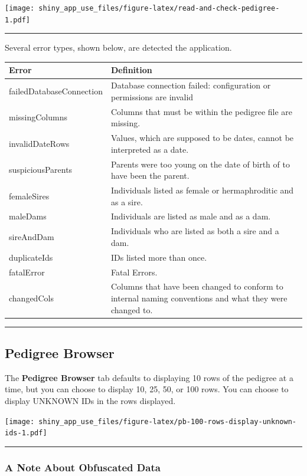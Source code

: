\documentclass[
]{article}
\begin{document}
\texttt{[image: shiny\_app\_use\_files/figure-latex/read-and-check-pedigree-1.pdf]}

\begin{center}\rule{0.5\linewidth}{\linethickness}\end{center}

Several error types, shown below, are detected the application.

\begin{longtable}[]{@{}ll@{}}
\toprule
Error & Definition\tabularnewline
\midrule
\endhead
failedDatabaseConnection & Database connection failed: configuration or
permissions are invalid\tabularnewline
missingColumns & Columns that must be within the pedigree file are
missing.\tabularnewline
invalidDateRows & Values, which are supposed to be dates, cannot be
interpreted as a date.\tabularnewline
suspiciousParents & Parents were too young on the date of birth of to
have been the parent.\tabularnewline
femaleSires & Individuals listed as female or hermaphroditic and as a
sire.\tabularnewline
maleDams & Individuals are listed as male and as a dam.\tabularnewline
sireAndDam & Individuals who are listed as both a sire and a
dam.\tabularnewline
duplicateIds & IDs listed more than once.\tabularnewline
fatalError & Fatal Errors.\tabularnewline
changedCols & Columns that have been changed to conform to internal
naming conventions and what they were changed to.\tabularnewline
\bottomrule
\end{longtable}

\begin{center}\rule{0.5\linewidth}{\linethickness}\end{center}

\hypertarget{pedigree-browser}{%
\subsection{Pedigree Browser}\label{pedigree-browser}}

The \textbf{Pedigree Browser} tab defaults to displaying 10 rows of the
pedigree at a time, but you can choose to display 10, 25, 50, or 100
rows. You can choose to display UNKNOWN IDs in the rows displayed.

\texttt{[image: shiny\_app\_use\_files/figure-latex/pb-100-rows-display-unknown-ids-1.pdf]}

\begin{center}\rule{0.5\linewidth}{\linethickness}\end{center}

\hypertarget{a-note-about-obfuscated-data}{%
\subsubsection{A Note About Obfuscated
Data}\label{a-note-about-obfuscated-data}}
\end{document}
